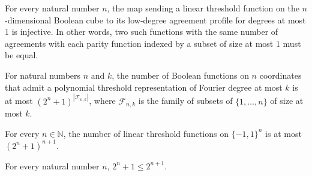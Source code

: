 \begin{theorem}
\label{FABL.lowDegreeAgreementProfile_injective_on_linearThreshold}
\leanok
{}
For every natural number $n$, the map sending a linear threshold function on the
$n$-dimensional Boolean cube to its low-degree agreement profile for degrees at most $1$
is injective. In other words, two such functions with the same number of agreements with
each parity function indexed by a subset of size at most $1$ must be equal.
\end{theorem}

\begin{theorem}
\label{FABL.natCard_polynomialThresholdFunction_le_profileCount}
\leanok
{}
For natural numbers $n$ and $k$, the number of Boolean functions on $n$ coordinates that
admit a polynomial threshold representation of Fourier degree at most $k$ is at most
$(2^n+1)^{|\mathcal{F}_{n,k}|}$, where $\mathcal{F}_{n,k}$ is the family of subsets of
$\{1,\ldots,n\}$ of size at most $k$.
\end{theorem}

\begin{theorem}
\label{FABL.natCard_linearThresholdFunction_le_profileCount}
\leanok
{}
For every $n\in\mathbb N$, the number of linear threshold functions on $\{−1,1\}^n$ is
at most $(2^n+1)^{n+1}$.
\end{theorem}

\begin{theorem}
\label{FABL.two_pow_add_one_le_next_two_pow}
\leanok
{}
For every natural number $n$, $2^n+1\le 2^{n+1}$.
\end{theorem}

